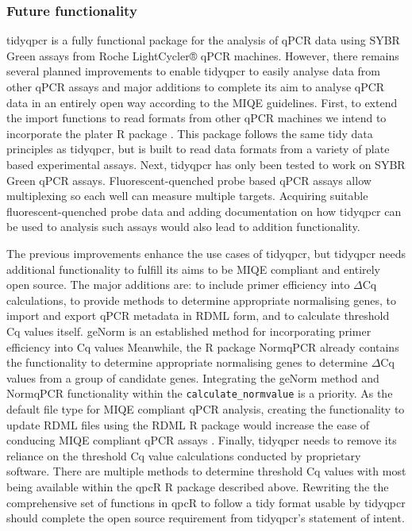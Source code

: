 \documentclass[../main.tex]{subfiles}
\begin{document}
\subsubsection{Future functionality}

tidyqpcr is a fully functional package for the analysis of qPCR data using SYBR Green assays from Roche LightCycler® qPCR machines. 
However, there remains several planned improvements to enable tidyqpcr to easily analyse data from other qPCR assays and major additions to complete its aim to analyse qPCR data in an entirely open way according to the MIQE guidelines.
First, to extend the import functions to read formats from other qPCR machines we intend to incorporate the plater R package \parencite{Hughes2016}.
This package follows the same tidy data principles as tidyqpcr, but is built to read data formats from a variety of plate based experimental assays.
Next, tidyqpcr has only been tested to work on SYBR Green qPCR assays.
Fluorescent-quenched probe based qPCR assays allow multiplexing so each well can measure multiple targets. 
Acquiring suitable fluorescent-quenched probe data and adding documentation on how tidyqpcr can be used to analysis such assays would also lead to addition functionality. 

The previous improvements enhance the use cases of tidyqpcr, but tidyqpcr needs additional functionality to fulfill its aims to be MIQE compliant and entirely open source.
The major additions are: to include primer efficiency into $\Delta$Cq calculations, to provide methods to determine appropriate normalising genes, to import and export qPCR metadata in RDML form, and to calculate threshold Cq values itself. 
geNorm is an established method for incorporating primer efficiency into Cq values 
Meanwhile, the R package NormqPCR already contains the functionality to determine appropriate normalising genes to determine $\Delta$Cq values from a group of candidate genes. 
Integrating the geNorm method and NormqPCR functionality within the \lstinline{calculate_normvalue} is a priority.
As the default file type for MIQE compliant qPCR analysis, creating the functionality to update RDML files using the RDML R package would increase the ease of conducing MIQE compliant qPCR assays \parencite{Roediger2017}.
Finally, tidyqpcr needs to remove its reliance on the threshold Cq value calculations conducted by proprietary software. 
There are multiple methods to determine threshold Cq values with most being available within the qpcR R package described above.
Rewriting the the comprehensive set of functions in qpcR to follow a tidy format usable by tidyqpcr should complete the open source requirement from tidyqpcr's statement of intent. 
\end{document}
